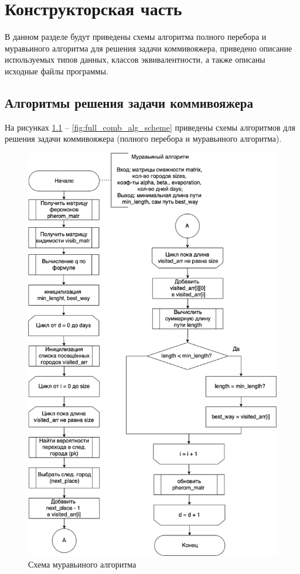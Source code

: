 \chapter{Конструкторская часть}

В данном разделе будут приведены схемы алгоритма полного перебора и муравьиного алгоритма для решения задачи коммивояжера, приведено описание используемых типов данных, классов эквивалентности, а также описаны исходные файлы программы.

\section{Алгоритмы решения задачи коммивояжера}

На рисунках \ref{fig:ant_alg_scheme} -- \ref{fig:full_comb_alg_scheme} приведены схемы алгоритмов для решения задачи коммивояжера (полного перебора и муравьиного алгоритма).

\begin{figure}[h]
	\centering
	\includegraphics[scale=0.55]{img/ant_alg_scheme.png}
	\caption{Схема муравьиного алгоритма}
	\label{fig:ant_alg_scheme}
\end{figure}

